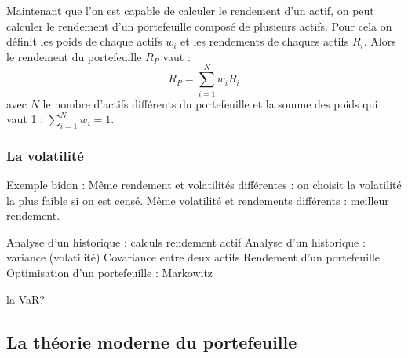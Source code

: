 Maintenant que l'on est capable de calculer le rendement d'un actif, on peut calculer le rendement d'un portefeuille composé de plusieurs actifs. Pour cela on définit les poids de chaque actifs $w_i$ et les rendements de chaques actifs $R_i$. Alors le rendement du portefeuille $R_P$ vaut :
\[ R_P = \sum_{i=1}^{N}w_iR_i\]
avec $N$ le nombre d'actifs différents du portefeuille et la somme des poids qui vaut 1 : \(\sum_{i=1}^{N}w_i =1\).

\subsubsection{La volatilité}


	  Exemple bidon :
Même rendement et volatilités différentes : on choisit la volatilité la plus faible si on est censé.
Même volatilité et rendements différents : meilleur rendement.

Analyse d'un historique : calculs rendement actif
Analyse d'un historique : variance (volatilité)
Covariance entre deux actifs
Rendement d'un portefeuille
Optimisation d'un portefeuille : Markowitz


la VaR?

\subsection{La théorie moderne du portefeuille}
